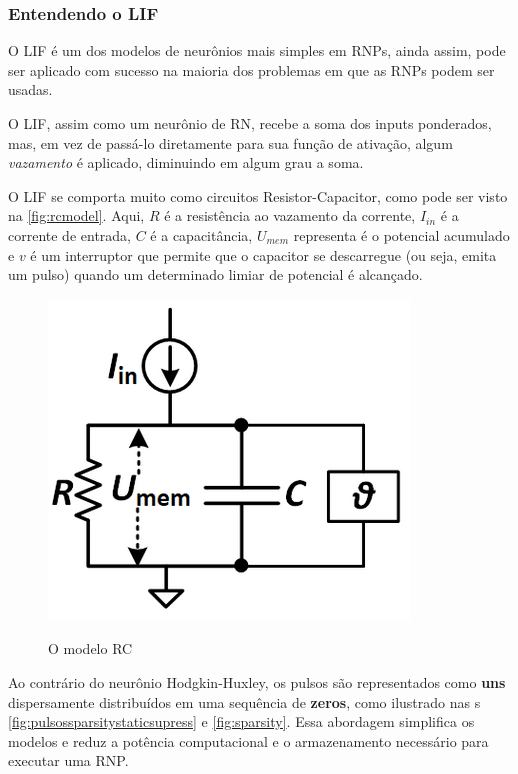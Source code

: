 		\subsubsection{Entendendo o LIF}
			
			\par O LIF é um dos modelos de neurônios mais simples em RNPs, ainda assim, pode ser aplicado com sucesso na maioria dos problemas em que as RNPs podem ser usadas.
			
			\par O LIF, assim como um neurônio de RN, recebe a soma dos inputs ponderados, mas, em vez de passá-lo diretamente para sua função de ativação, algum \textit{vazamento} é aplicado, diminuindo em algum grau a soma.
			
			\par O LIF se comporta muito como circuitos Resistor-Capacitor, como pode ser visto na  \autoref{fig:rcmodel}. Aqui, $R$ é a resistência ao vazamento da corrente, $I_{in}$ é a corrente de entrada, $C$ é a capacitância, $U_{mem}$ representa é o potencial acumulado e $v$ é um interruptor que permite que o capacitor se descarregue (ou seja, emita um pulso) quando um determinado limiar de potencial é alcançado.
			
			\begin{figure}[H]
				\centering
				\caption[Modelo RC]{O modelo RC}
				\includegraphics[width=0.4\linewidth]{images/rcmodel}
				\label{fig:rcmodel}
			\end{figure}
			
			\par Ao contrário do neurônio Hodgkin-Huxley, os pulsos são representados como \textbf{uns} dispersamente distribuídos em uma sequência de \textbf{zeros}, como ilustrado nas s \autoref{fig:pulsossparsitystaticsupress} e \autoref{fig:sparsity}. Essa abordagem simplifica os modelos e reduz a potência computacional e o armazenamento necessário para executar uma RNP.
			
